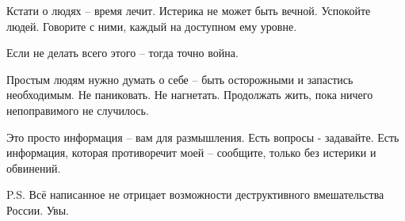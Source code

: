 Кстати о людях – время лечит. Истерика не может быть вечной. Успокойте людей.
Говорите с ними, каждый на доступном ему уровне.

Если не делать всего этого – тогда точно война.

Простым людям нужно думать о себе – быть осторожными и запастись необходимым.
Не паниковать. Не нагнетать. Продолжать жить, пока ничего непоправимого не
случилось.

Это просто информация – вам для размышления. Есть вопросы - задавайте. Есть
информация, которая противоречит моей – сообщите, только без истерики и
обвинений.

P.S. Всё написанное не отрицает возможности деструктивного вмешательства
России. Увы.

